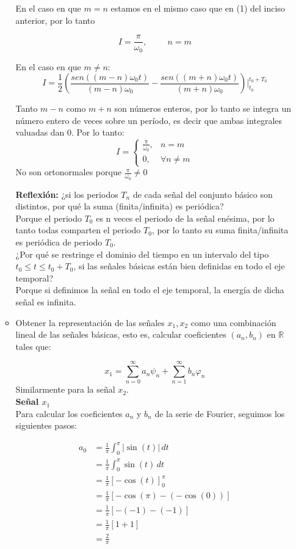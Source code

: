 \documentclass[12pt,a4paper]{report}
\begin{document}
\begin{enumerate}[label=\alph*),left=0pt]
\begin{itemize}[left=0pt]
        En el caso en que $m=n$ estamos en el mismo caso que en (1) del inciso anterior, por lo tanto 

        $$
        I=\frac{\pi}{\omega_0}, \hspace{1cm}n=m
        $$

        En el caso en que $m\neq n$:
        $$
        I=\frac{1}{2}(\frac{sen((m-n)\omega_0t)}{(m-n)\omega_0}-\frac{sen((m+n)\omega_0t)}{(m+n)\omega_0})|^{t_0+T_0}_{t_0}
        $$

        Tanto $m-n$ como $m+n$ son números enteros, por lo tanto se integra un número entero de veces sobre un período, es decir que ambas integrales valuadas dan 0. Por lo tanto:
        $$
        I=\begin{cases}
            \frac{\pi}{\omega_0},&n=m\\
            0,&\forall n\neq m
        \end{cases}
        $$
        No son ortonormales porque $\frac{\pi}{\omega_0}\neq 0$	


	\textbf{Reflexión:} ¿si los periodos $T_n$ de cada señal del conjunto básico son distintos, por qué la suma 
      (finita/infinita) es periódica? \\
	Porque el periodo $T_0$ es n veces el periodo de la señal enésima, por lo tanto todas comparten el periodo $T_0$, por lo tanto su suma finita/infinita es periódica de periodo $T_0$.\\

	¿Por qué se restringe el dominio del tiempo en un intervalo del tipo 
      $t_0 \leq t \leq t_0 + T_0$, si las señales básicas están bien definidas en todo el eje temporal?\\
		Porque si definimos la señal en todo el eje temporal, la energía de dicha señal es infinita.
   \item Obtener la representación de las señales $x_1, x_2$ como una combinación lineal de las señales básicas, 
     esto es, calcular coeficientes $(a_n, b_n)$ en $\mathbb{R}$ tales que:

     $$x_1 = \sum_{n=0}^{\infty} a_n \psi_n + \sum_{n=1}^{\infty} b_n \varphi_n$$
     Similarmente para la señal $x_2$.\\

  \textbf{Señal $x_1$}\\
  Para calcular los coeficientes \(a_n\) y \(b_n\) de la serie de Fourier, seguimos los siguientes pasos:

  $$
  \begin{aligned}
    a_0 &= \frac{1}{\pi} \int_0^\pi |\sin(t)| \, dt \\
        &= \frac{1}{\pi} \int_0^\pi \sin(t) \, dt \\
        &= \frac{1}{\pi} \left[ -\cos(t) \right]_0^\pi \\
        &= \frac{1}{\pi} \left[ -\cos(\pi) - (-\cos(0)) \right] \\
        &= \frac{1}{\pi} \left[ -(-1) - (-1) \right] \\
        &= \frac{1}{\pi} \left[ 1 + 1 \right] \\
        &= \frac{2}{\pi}
  \end{aligned}
  $$
  

\end{itemize}
\end{enumerate}
\end{document}
